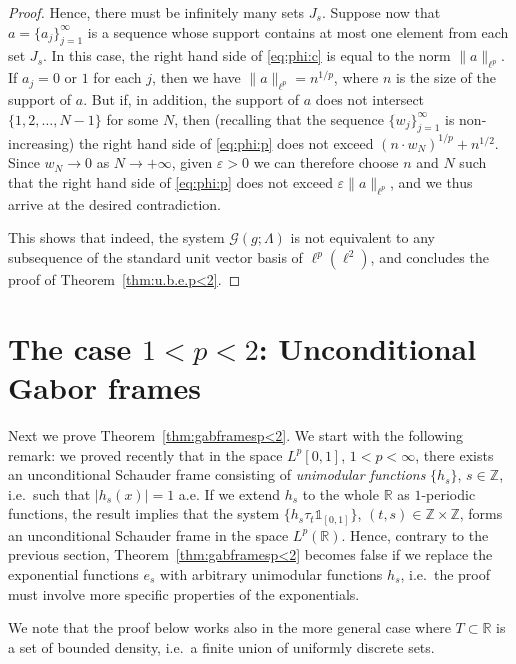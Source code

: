 \documentclass[reqno,a4paper,12pt]{amsart}
\numberwithin{equation}{section}
\numberwithin{figure}{section}
\newcommand\R{\mathbb{R}}
\newcommand\Z{\mathbb{Z}}
\newcommand\G{\mathcal{G}}
\newcommand\1{\mathds{1}}
\newcommand\eps{\varepsilon}
\newcommand{\TTT}{T}
\newcommand\sbt{\subset}
\theoremstyle{plain}
\newcommand{\thmref}[1]{Theorem~\ref{#1}}
\theoremstyle{definition}
\begin{document}
\begin{proof}
Hence, there must be infinitely many sets $J_s$. Suppose now that $a = \{a_j\}_{j=1}^{\infty}$ is a sequence whose support contains at most one element from each set $J_s$. In this case, the right hand side of \eqref{eq:phi:c} is equal to the norm $\|a\|_{\ell^p}$. 
If $a_j = 0$ or $1$ for each $j$, then
we have $\|a\|_{\ell^p} = n^{1/p}$, where $n$ is the size of the support of $a$.
But if, in addition, the support of $a$ does not intersect $\{1, 2, \dots, N-1\}$ for some $N$, then (recalling that the sequence $\{w_j\}_{j=1}^{\infty}$ is non-increasing) the right hand side of \eqref{eq:phi:p} does not exceed $ (n \cdot w_{N} )^{1/p} +  n^{1/2}$. Since $w_N \to 0$ as $N \to + \infty$, given $\eps>0$ we can therefore choose $n$ and $N$ such that the right hand side of \eqref{eq:phi:p} does not exceed $\eps \|a\|_{\ell^p}$, and we thus arrive at the desired contradiction.

This shows that indeed, the system $\G(g;\Lambda)$ is not equivalent to any subsequence of the standard unit vector basis of $\ell^p(\ell^2)$, and concludes the proof of \thmref{thm:u.b.e.p<2}.
\end{proof}






\section{The case $1 < p < 2$: Unconditional Gabor frames}
\label{sec:framesp<2}

Next we prove \thmref{thm:gabframesp<2}. We start with the following remark: we proved recently \cite{LT25b} that in the space $L^p[0,1]$, $1 < p < \infty$, there exists an unconditional Schauder frame consisting of \emph{unimodular functions} $\{h_s\}$, $s \in \Z$,
i.e.\ such that $|h_s(x)|=1$ a.e.
 If we extend $h_s$ to the whole $\R$ as $1$-periodic functions, the result implies that the system
$\{ h_s \tau_t \1_{[0,1]} \}$, $(t,s) \in \Z \times \Z$, forms an unconditional Schauder frame in the space $L^p(\R)$. Hence, contrary to the previous section, \thmref{thm:gabframesp<2} becomes false if we replace the exponential functions $e_s$ with arbitrary unimodular functions $h_s$, i.e.\ the proof must involve more specific properties of the exponentials.

We note that the proof below works also in the more general case where $\TTT \sbt \R$ is a set of bounded density, i.e.\ a finite union of uniformly discrete sets.
\end{document}
